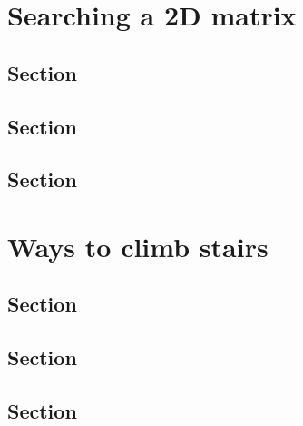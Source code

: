\documentclass[12pt]{article}
\begin{document}
\section{Searching a 2D matrix}


\subsection{Section}

\subsection{Section}

\subsection{Section}


\section{Ways to climb stairs}


\subsection{Section}

\subsection{Section}

\subsection{Section}
\end{document}
